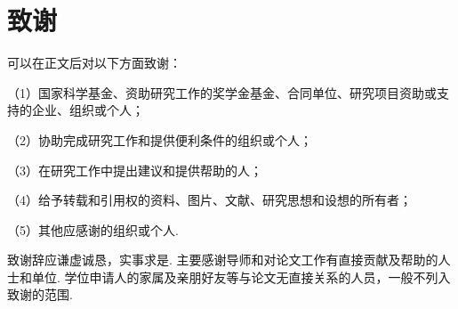 \documentclass[UTF8]{ctexart}
\begin{document}
\part*{致谢}

可以在正文后对以下方面致谢：\par
（1）国家科学基金、资助研究工作的奖学金基金、合同单位、研究项目资助或支持的企业、组织或个人；\par
（2）协助完成研究工作和提供便利条件的组织或个人；\par
（3）在研究工作中提出建议和提供帮助的人；\par
（4）给予转载和引用权的资料、图片、文献、研究思想和设想的所有者；\par
（5）其他应感谢的组织或个人.\par
致谢辞应谦虚诚恳，实事求是. 主要感谢导师和对论文工作有直接贡献及帮助的人士和单位. 学位申请人的家属及亲朋好友等与论文无直接关系的人员，一般不列入致谢的范围.

\end{document}
